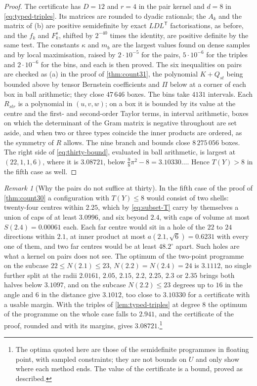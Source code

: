 \documentclass[11pt,reqno]{amsart}
\renewcommand{\_}{\origunderscore\allowbreak}
\numberwithin{equation}{section}
\theoremstyle{plain}
\theoremstyle{definition}
\theoremstyle{remark}
\newtheorem{remark}[thm]{Remark}
\begin{document}
\begin{proof}
The certificate has $D=12$ and $r=4$ in the pair kernel and $d=8$ in
\eqref{eq:typed-triples}. Its matrices are rounded to dyadic rationals; the
$A_k$ and the matrix of (b) are positive semidefinite by exact
$LDL^{\mathsf T}$ factorisations, as before, and the $f_k$ and $F^s_k$,
shifted by $2^{-40}$ times the identity, are positive definite by the same
test. The constants $\kappa$ and $m_b$ are the largest values found on
dense samples and by local maximisation, raised by $2\cdot10^{-5}$ for the
pairs, $5\cdot10^{-6}$ for the triples and $2\cdot10^{-6}$ for the bins, and
each is then proved. The six inequalities on pairs are checked as (a) in the
proof of \cref{thm:count31}, the polynomial $K+Q_{st}$ being bounded above
by tensor Bernstein coefficients and $\Pi$ below at a corner of each box in
ball arithmetic; they close $47\,646$ boxes. The bins take $4131$
intervals. Each $R_{str}$ is a polynomial in $(u,v,w)$; on a box it is
bounded by its value at the centre and the first- and second-order Taylor
terms, in interval arithmetic, boxes on which the determinant of the Gram
matrix is negative throughout are set aside, and when two or three types
coincide the inner products are ordered, as the symmetry of $R$ allows. The
nine branch and bounds close $8\,275\,056$ boxes. The right side of
\eqref{eq:thirty-bound}, evaluated in ball arithmetic, is largest at
$(22,1,1,6)$, where it is $3.08721$, below $\frac98\pi^2-8=3.10330\ldots$.
Hence $T(Y)>8$ in the fifth case as well.
\end{proof}

\begin{remark}[Why the pairs do not suffice at thirty]\label{rem:thirty-pairs}
In the fifth case of the proof of \cref{thm:count30} a configuration with
$T(Y)\le8$ would consist of two shells: twenty-four centres within $2.25$,
which by \eqref{eq:subset-T} carry by themselves a union of caps of at least
$3.0996$, and six beyond $2.4$, with caps of volume at most
$S(2.4)=0.00061$ each. Each far centre would sit in a hole of the $22$ to
$24$ directions within $2.1$, at inner product at most $a(2.1,\sqrt6)=0.6231$
with every one of them, and two far centres would be at least $48.2^\circ$
apart. Such holes are what a kernel on pairs does not see. The optimum of
the two-point programme on the subcase $22\le N(2.1)\le23$,
$N(2.2)=N(2.4)=24$ is $3.1112$, no single further split at the radii
$2.0161$, $2.05$, $2.15$, $2.2$, $2.25$, $2.3$ or $2.35$ brings both halves
below $3.1097$, and on the subcase $N(2.2)\le23$ degrees up to $16$ in the
angle and $6$ in the distance give $3.1012$, too close to $3.10330$ for a
certificate with a usable margin. With the triples of
\cref{lem:typed-triples} at degree $8$ the optimum of the programme on the
whole case falls to $2.941$, and the certificate of the proof, rounded and
with its margins, gives $3.08721$.\footnote{The optima quoted here are
those of the semidefinite programmes in floating point, with sampled
constraints; they are not bounds on $U$ and only show where each method
ends. The value of the certificate is a bound, proved as described.}
\end{remark}
\end{document}
